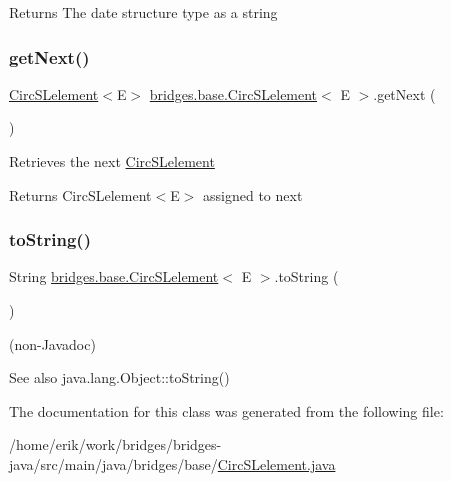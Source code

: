 \begin{DoxyReturn}{Returns}
The date structure type as a string 
\end{DoxyReturn}
\mbox{\label{classbridges_1_1base_1_1_circ_s_lelement_ae18b07e3f1d37b5eca0cae22efc0d395}} 
\subsubsection{\texorpdfstring{get\+Next()}{getNext()}}
{\footnotesize\ttfamily \hyperlink{classbridges_1_1base_1_1_circ_s_lelement}{Circ\+S\+Lelement}$<$E$>$ \hyperlink{classbridges_1_1base_1_1_circ_s_lelement}{bridges.\+base.\+Circ\+S\+Lelement}$<$ E $>$.get\+Next (\begin{DoxyParamCaption}{ }\end{DoxyParamCaption})}

Retrieves the next \hyperlink{classbridges_1_1base_1_1_circ_s_lelement}{Circ\+S\+Lelement}

\begin{DoxyReturn}{Returns}
Circ\+S\+Lelement$<$\+E$>$ assigned to next 
\end{DoxyReturn}
\mbox{\label{classbridges_1_1base_1_1_circ_s_lelement_af307188926766e73efb988f102ce9740}} 
\subsubsection{\texorpdfstring{to\+String()}{toString()}}
{\footnotesize\ttfamily String \hyperlink{classbridges_1_1base_1_1_circ_s_lelement}{bridges.\+base.\+Circ\+S\+Lelement}$<$ E $>$.to\+String (\begin{DoxyParamCaption}{ }\end{DoxyParamCaption})}

(non-\/\+Javadoc)

\begin{DoxySeeAlso}{See also}
java.\+lang.\+Object\+::to\+String() 
\end{DoxySeeAlso}


The documentation for this class was generated from the following file\+:\begin{DoxyCompactItemize}
\item 
/home/erik/work/bridges/bridges-\/java/src/main/java/bridges/base/\hyperlink{_circ_s_lelement_8java}{Circ\+S\+Lelement.\+java}\end{DoxyCompactItemize}
